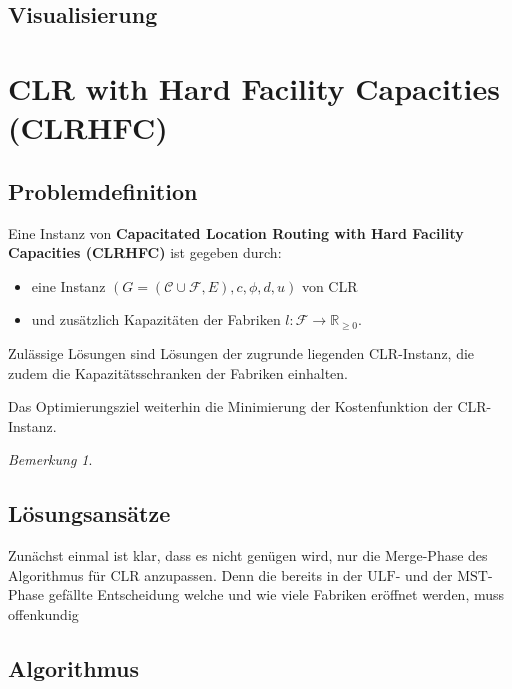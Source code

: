 \documentclass[a4paper,ngerman,12pt,bibtotoc]{scrartcl}
\theoremstyle{definition}
\theoremstyle{plain}
\theoremstyle{remark}
\newtheorem{bem}[defn]{Bemerkung}
\newcommand{\IR}{\mathbb{R}}
\newcommand{\ClientSet}{\mathscr{C}}
\newcommand{\FacilitySet}{\mathscr{F}}
\newcommand{\CLR}{\mathrm{CLR}}
\newcommand{\MST}{\mathrm{MST}}
\newcommand{\ULF}{\mathrm{ULF}}
\begin{document}
\subsection{Visualisierung}


	

\section{CLR with Hard Facility Capacities (CLRHFC)}

	\subsection{Problemdefinition}

Eine Instanz von \textbf{Capacitated Location Routing with Hard Facility Capacities (CLRHFC)} ist gegeben durch:
\begin{itemize}
	\item eine Instanz $(G=(\ClientSet\cup\FacilitySet,E), c,\phi,d,u)$ von CLR
	\item und zusätzlich Kapazitäten der Fabriken $l: \FacilitySet \to \IR_{\geq 0}$.
\end{itemize}
Zulässige Lösungen sind Lösungen der zugrunde liegenden CLR-Instanz, die zudem die Kapazitätsschranken der Fabriken einhalten.

Das Optimierungsziel weiterhin die Minimierung der Kostenfunktion der CLR-Instanz.

\begin{bem}
\end{bem}

	\subsection{Lösungsansätze}
	
	Zunächst einmal ist klar, dass es nicht genügen wird, nur die Merge-Phase des Algorithmus für $\CLR$ anzupassen. Denn die bereits in der $\ULF$- und der $\MST$-Phase gefällte Entscheidung welche und wie viele Fabriken eröffnet werden, muss offenkundig 


	\subsection{Algorithmus}
	
\end{document}
